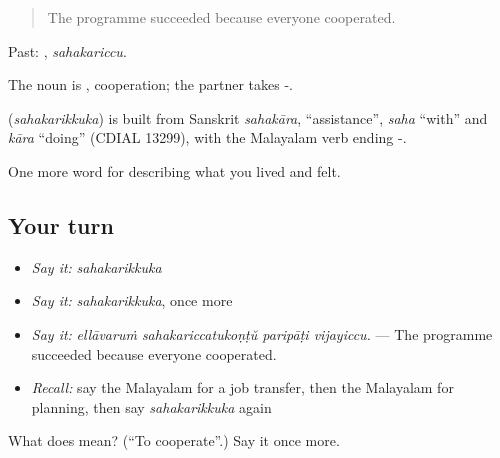 \begin{quote}
The programme succeeded because everyone cooperated.
\end{quote}

Past: , \emph{sahakariccu}.

The noun is , cooperation; the partner takes -.

\begin{cousinweb}
\textbf{} (\emph{sahakarikkuka}) is built from Sanskrit \emph{sahakāra}, \textquotedblleft{}assistance\textquotedblright{}, \emph{saha} \textquotedblleft{}with\textquotedblright{} and \emph{kāra} \textquotedblleft{}doing\textquotedblright{} (CDIAL 13299), with the Malayalam verb ending -.
\end{cousinweb}

\begin{grammarlens}[title={What you've built}]
One more word for describing what you lived and felt.
\end{grammarlens}

\subsection*{Your turn}
\begin{itemize}
\raggedright
  \item \emph{Say it:} \emph{sahakarikkuka}
  \item \emph{Say it:} \emph{sahakarikkuka}, once more
  \item \emph{Say it:} \emph{ellāvaruṁ sahakariccatukoṇṭŭ paripāṭi vijayiccu.} — The programme succeeded because everyone cooperated.
  \item \emph{Recall:} say the Malayalam for a job transfer, then the Malayalam for planning, then say \emph{sahakarikkuka} again
\end{itemize}

\begin{tcolorbox}[breakable,colback=teal!4,colframe=teal!35!black,title={Before you move on}]
What does  mean? (\textquotedblleft{}To cooperate\textquotedblright{}.) Say it once more.
\end{tcolorbox}
